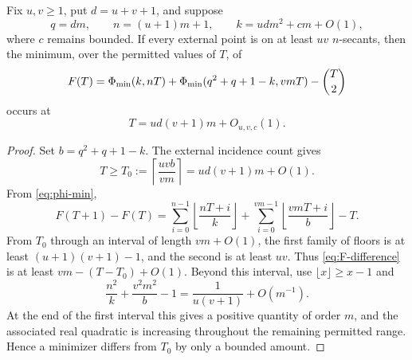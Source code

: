 \begin{lemma}
\label{lem:secant-number-near-equality}
Fix \(u,v\ge1\), put \(d=u+v+1\), and suppose
\[
 q=dm,\qquad n=(u+1)m+1,\qquad
 k=udm^2+cm+O(1),
\]
where \(c\) remains bounded.  If every external point is on at least
\(uv\) \(n\)-secants, then the minimum, over the permitted values of \(T\),
of
\begin{equation}\label{eq:F-definition}
 F(T)=\Phi_{\min}(k,nT)
 +\Phi_{\min}(q^2+q+1-k,vmT)-\binom T2
\end{equation}
occurs at
\begin{equation}\label{eq:T-localization}
 T=ud(v+1)m+O_{u,v,c}(1).
\end{equation}
\end{lemma}

\begin{proof}
Set \(b=q^2+q+1-k\).  The external incidence count gives
\begin{equation}\label{eq:T-minimum}
 T\ge T_0:=\left\lceil\frac{uvb}{vm}\right\rceil
 =ud(v+1)m+O(1).
\end{equation}
From \eqref{eq:phi-min},
\begin{equation}\label{eq:F-difference}
 F(T+1)-F(T)
 =\sum_{i=0}^{n-1}\left\lfloor\frac{nT+i}{k}\right\rfloor
 +\sum_{i=0}^{vm-1}\left\lfloor\frac{vmT+i}{b}\right\rfloor-T.
\end{equation}
From \(T_0\) through an interval of length \(vm+O(1)\), the first family of
floors is at least \((u+1)(v+1)-1\), and the second is at least \(uv\).
Thus \eqref{eq:F-difference} is at least
\(vm-(T-T_0)+O(1)\).  Beyond this interval, use
\(\lfloor x\rfloor\ge x-1\) and
\[
 \frac{n^2}{k}+\frac{v^2m^2}{b}-1
 =\frac1{u(v+1)}+O(m^{-1}).
\]
At the end of the first interval this gives a positive quantity of order
\(m\), and the associated real quadratic is increasing throughout the
remaining permitted range.  Hence a minimizer differs from \(T_0\) by only a
bounded amount.
\end{proof}

